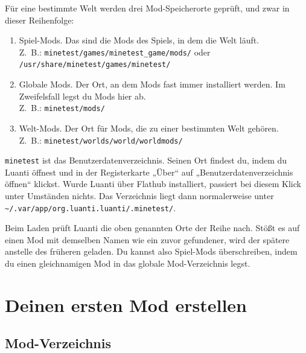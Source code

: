 Für eine bestimmte Welt werden drei Mod-Speicherorte geprüft, und zwar
in dieser Reihenfolge:

\begin{enumerate}
\def\labelenumi{\arabic{enumi}.}
\tightlist
\item
  Spiel-Mods. Das sind die Mods des Spiels, in dem die Welt läuft.\\
  Z.~B.:
  \texttt{minetest/\allowbreak{}games/\allowbreak{}minetest\_\allowbreak{}game/\allowbreak{}mods/\allowbreak{}}
  oder\\
  \texttt{/\allowbreak{}usr/\allowbreak{}share/\allowbreak{}minetest/\allowbreak{}games/\allowbreak{}minetest/\allowbreak{}}
\item
  Globale Mods. Der Ort, an dem Mods fast immer installiert werden. Im
  Zweifelsfall legst du Mods hier ab.\\
  Z.~B.: \texttt{minetest/\allowbreak{}mods/\allowbreak{}}
\item
  Welt-Mods. Der Ort für Mods, die zu einer bestimmten Welt gehören.\\
  Z.~B.:
  \texttt{minetest/\allowbreak{}worlds/\allowbreak{}world/\allowbreak{}worldmods/\allowbreak{}}
\end{enumerate}

\texttt{minetest} ist das
Benutzerdatenverzeichnis.
Seinen Ort findest du, indem du Luanti öffnest und in der Registerkarte
„Über`` auf „Benutzerdatenverzeichnis öffnen`` klickst. Wurde Luanti
über Flathub installiert, passiert bei diesem Klick unter Umständen
nichts. Das Verzeichnis liegt dann normalerweise unter
\texttt{\textasciitilde{}/.\allowbreak{}var/\allowbreak{}app/\allowbreak{}org.\allowbreak{}luanti.\allowbreak{}luanti/.\allowbreak{}minetest/\allowbreak{}}.

Beim Laden prüft Luanti die oben genannten Orte der Reihe nach. Stößt es
auf einen Mod mit demselben Namen wie ein zuvor gefundener, wird der
spätere anstelle des früheren geladen. Du kannst also Spiel-Mods
überschreiben, indem du einen gleichnamigen Mod in das globale
Mod-Verzeichnis legst.

\section{Deinen ersten Mod erstellen}\label{deinen-ersten-mod-erstellen}

\subsection{Mod-Verzeichnis}\label{mod-verzeichnis}


